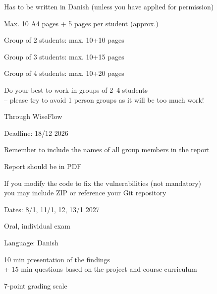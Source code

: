 \documentclass[Screen16to9,17pt]{foils}
\begin{document}

\begin{list2}
\item Has to be written in Danish (unless you have applied for permission)
\item Max. 10 A4 pages + 5 pages per student (approx.)
  \begin{list2}
  \item Group of 2 students: max. 10+10 pages
  \item Group of 3 students: max. 10+15 pages
  \item Group of 4 students: max. 10+20 pages
  \end{list2}
\item Do your best to work in groups of 2--4 students\\
  -- please try to avoid 1 person groups as it will be too much work!
\end{list2}


\begin{list2}
\item Through WiseFlow
\item Deadline: 18/12 2026
\item Remember to include the names of all group members in the report
\item Report should be in PDF
\item If you modify the code to fix the vulnerabilities (not mandatory)\\
you may include ZIP or reference your Git repository
\end{list2}


\begin{list2}
\item Dates: 8/1, 11/1, 12, 13/1 2027
\item Oral, individual exam
\item Language: Danish
\item 10 min presentation of the findings\\
  + 15 min questions based on the project and course curriculum
\item 7-point grading scale
\end{list2}

\end{document}
